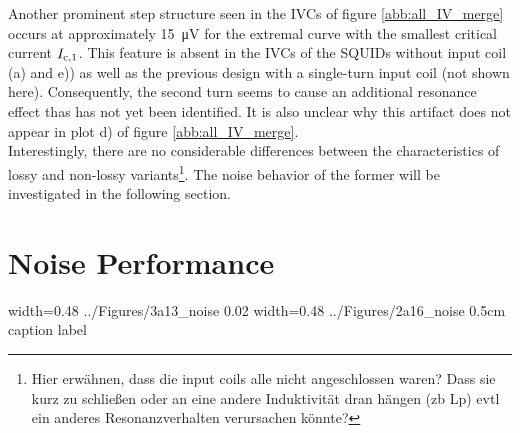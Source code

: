 Another prominent step structure seen in the IVCs of figure \ref{abb:all_IV_merge} occurs at approximately \qty{15}{\uV} for the extremal curve with the smallest critical current $I_{\rm c,1}$. This feature is absent in the IVCs of the SQUIDs without input coil (a) and e)) as well as the previous design with a single-turn input coil (not shown here). Consequently, the second turn seems to cause an additional resonance effect thas has not yet been identified. It is also unclear why this artifact does not appear in plot d) of figure \ref{abb:all_IV_merge}. 
\\
Interestingly, there are no considerable differences between the characteristics of lossy and non-lossy variants\footnote{Hier erwähnen, dass die input coils alle nicht angeschlossen waren? Dass sie kurz zu schließen oder an eine andere Induktivität dran hängen (zb Lp) evtl ein anderes Resonanzverhalten verursachen könnte?}. The noise behavior of the former will be investigated in the following section.
 




\section{Noise Performance} \label{sec_noise_results}


{width=0.48\textwidth}
{../Figures/3a13_noise}
{0.02\textwidth} %
{width=0.48\textwidth}
{../Figures/2a16_noise}
{0.5cm} %
{caption}
{label}

